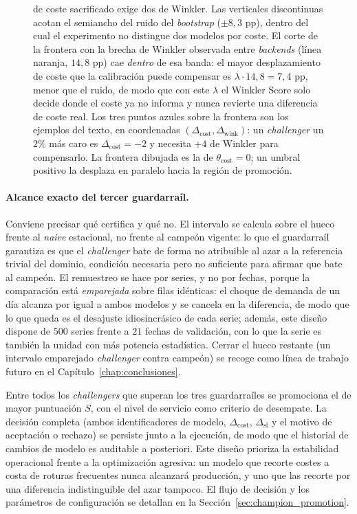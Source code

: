 \begin{figure}[H]
{de coste sacrificado exige dos de Winkler. Las verticales discontinuas acotan el semiancho del ruido
del \textit{bootstrap} ($\pm 8{,}3$ pp), dentro del cual el experimento no distingue dos modelos por coste. El corte de la
frontera con la brecha de Winkler observada entre \textit{backends} (línea naranja, $14{,}8$ pp) cae
\emph{dentro} de esa banda: el mayor desplazamiento de coste que la calibración puede compensar es
$\lambda \cdot 14{,}8 = 7{,}4$ pp, menor que el ruido, de modo que con este $\lambda$ el Winkler Score
solo decide donde el coste ya no informa y nunca revierte una diferencia de coste real. Los tres puntos
azules sobre la frontera son los ejemplos del texto, en coordenadas
$(\Delta_{\text{cost}}, \Delta_{\text{wink}})$: un \textit{challenger} un $2\%$ más caro es
$\Delta_{\text{cost}} = -2$ y necesita $+4$ de Winkler para compensarlo. La frontera dibujada es la de
$\theta_{\text{cost}} = 0$; un umbral positivo la desplaza en paralelo hacia la región de promoción.}
\label{fig:region_promocion}
\end{figure}

\paragraph{Alcance exacto del tercer guardarraíl.} Conviene precisar qué certifica y qué no. El intervalo se calcula sobre el hueco frente al \textit{naive} estacional, no frente al campeón vigente: lo que el guardarraíl garantiza es que el \textit{challenger} bate de forma no atribuible al azar a la referencia trivial del dominio, condición necesaria pero no suficiente para afirmar que bate al campeón. El remuestreo se hace por series, y no por fechas, porque la comparación está \emph{emparejada} sobre filas idénticas: el choque de demanda de un día alcanza por igual a ambos modelos y se cancela en la diferencia, de modo que lo que queda es el desajuste idiosincrásico de cada serie; además, este diseño dispone de $500$ series frente a $21$ fechas de validación, con lo que la serie es también la unidad con más potencia estadística. Cerrar el hueco restante (un intervalo emparejado \textit{challenger} contra campeón) se recoge como línea de trabajo futuro en el Capítulo~\ref{chap:conclusiones}.

Entre todos los \textit{challengers} que superan los tres guardarraíles se promociona el de mayor puntuación $S$, con el nivel de servicio como criterio de desempate. La decisión completa (ambos identificadores de modelo, $\Delta_{\text{cost}}$, $\Delta_{\text{sl}}$ y el motivo de aceptación o rechazo) se persiste junto a la ejecución, de modo que el historial de cambios de modelo es auditable a posteriori. Este diseño prioriza la estabilidad operacional frente a la optimización agresiva: un modelo que recorte costes a costa de roturas frecuentes nunca alcanzará producción, y uno que las recorte por una diferencia indistinguible del azar tampoco. El flujo de decisión y los parámetros de configuración se detallan en la Sección~\ref{sec:champion_promotion}.

